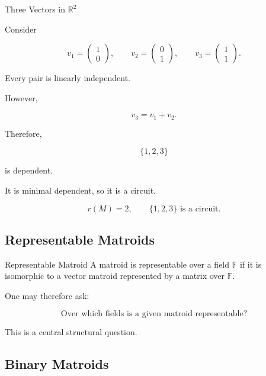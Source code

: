 \begin{workedexamplebox}{Three Vectors in \(\mathbb{R}^2\)}

Consider

\[
v_1=
\begin{pmatrix}
1\\
0
\end{pmatrix},
\qquad
v_2=
\begin{pmatrix}
0\\
1
\end{pmatrix},
\qquad
v_3=
\begin{pmatrix}
1\\
1
\end{pmatrix}.
\]

Every pair is linearly independent.

However,

\[
v_3=v_1+v_2.
\]

Therefore,

\[
\{1,2,3\}
\]

is dependent.

It is minimal dependent, so it is a circuit.

\begin{answerbox}
\[
\boxed{
r(M)=2,
\qquad
\{1,2,3\}\text{ is a circuit}.
}
\]
\end{answerbox}

\end{workedexamplebox}

\subsection{Representable Matroids}
\label{subsec:representable-matroids}

\begin{definitionbox}{Representable Matroid}
A matroid is representable over a field \(\mathbb{F}\) if it is
isomorphic to a vector matroid represented by a matrix over
\(\mathbb{F}\).
\end{definitionbox}

One may therefore ask:

\[
\boxed{
\text{Over which fields is a given matroid representable?}
}
\]

This is a central structural question.

\subsection{Binary Matroids}
\label{subsec:binary-matroids}

